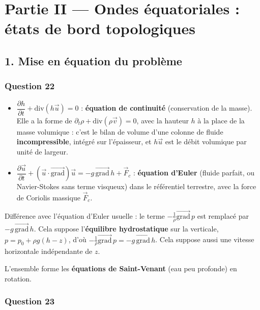 \documentclass[11pt,a4paper]{article}
\providecommand{\tightlist}{\setlength{\itemsep}{0pt}\setlength{\parskip}{0pt}}
\begin{document}
\hypertarget{partie-ii-ondes-uxe9quatoriales-uxe9tats-de-bord-topologiques}{%
\section{Partie II --- Ondes équatoriales : états de bord topologiques}\label{partie-ii-ondes-uxe9quatoriales-uxe9tats-de-bord-topologiques}}

\hypertarget{mise-en-uxe9quation-du-probluxe8me}{%
\subsection{1. Mise en équation du problème}\label{mise-en-uxe9quation-du-probluxe8me}}

\hypertarget{question-22}{%
\subsubsection{Question 22}\label{question-22}}

\begin{itemize}
\tightlist
\item
  \(\dfrac{\partial h}{\partial t}+\mathrm{div}(h\vec u)=0\) : \textbf{équation de continuité} (conservation de la masse). Elle a la forme de \(\partial_t\rho+\mathrm{div}(\rho\vec v)=0\), avec la hauteur \(h\) à la place de la masse volumique : c'est le bilan de volume d'une colonne de fluide \textbf{incompressible}, intégré sur l'épaisseur, et \(h\vec u\) est le débit volumique par unité de largeur.
\item
  \(\dfrac{\partial\vec u}{\partial t}+(\vec u\cdot\overrightarrow{\mathrm{grad}})\vec u=-g\,\overrightarrow{\mathrm{grad}}\,h+\vec F_c\) : \textbf{équation d'Euler} (fluide parfait, ou Navier-Stokes sans terme visqueux) dans le référentiel terrestre, avec la force de Coriolis massique \(\vec F_c\).
\end{itemize}

Différence avec l'équation d'Euler usuelle : le terme \(-\frac1\rho\overrightarrow{\mathrm{grad}}\,p\) est remplacé par \(-g\,\overrightarrow{\mathrm{grad}}\,h\). Cela suppose l'\textbf{équilibre hydrostatique} sur la verticale, \(p=p_0+\rho g(h-z)\), d'où \(-\frac1\rho\overrightarrow{\mathrm{grad}}\,p=-g\,\overrightarrow{\mathrm{grad}}\,h\). Cela suppose aussi une vitesse horizontale indépendante de \(z\).

L'ensemble forme les \textbf{équations de Saint-Venant} (eau peu profonde) en rotation.

\hypertarget{question-23}{%
\subsubsection{Question 23}\label{question-23}}
\end{document}
